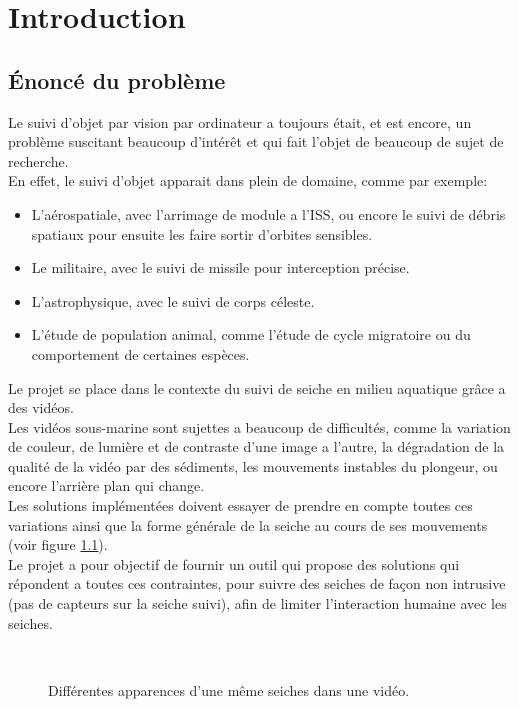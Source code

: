 \chapter{Introduction}





\section{Énoncé du problème}
Le suivi d'objet par vision par ordinateur a toujours était, et est encore, un problème suscitant beaucoup d'intérêt et qui fait l'objet de beaucoup de sujet de recherche.\\
En effet, le suivi d'objet apparait dans plein de domaine, comme par exemple:
\begin{itemize}
	\item L'aérospatiale, avec l'arrimage de module a l'ISS, ou encore le suivi de débris spatiaux pour ensuite les faire sortir d'orbites sensibles.
	\item Le militaire, avec le suivi de missile pour interception précise.
	\item L'astrophysique, avec le suivi de corps céleste.
	\item L'étude de population animal, comme l'étude de cycle migratoire ou du comportement de certaines espèces.\\
\end{itemize}

Le projet se place dans le contexte du suivi de seiche en milieu aquatique grâce a des vidéos.\\
Les vidéos sous-marine sont sujettes a beaucoup de difficultés, comme la variation de couleur, de lumière et de contraste d'une image a l'autre, la dégradation de la qualité de la vidéo par des sédiments, les mouvements instables du plongeur, ou encore l'arrière plan qui change.\\
Les solutions implémentées doivent essayer de prendre en compte toutes ces variations ainsi que la forme générale de la seiche au cours de ses mouvements (voir figure \ref{fig:cuttlefish_variation}).\\
Le projet a pour objectif de fournir un outil qui propose des solutions qui répondent a toutes ces contraintes, pour suivre des seiches de façon non intrusive (pas de capteurs sur la seiche suivi), afin de limiter l'interaction humaine avec les seiches.

\begin{figure}
\center
	\hspace{0.5cm}
	\\
	\hspace{0.5cm}
\caption{Différentes apparences d'une même seiches dans une vidéo.}
\label{fig:cuttlefish_variation}
\end{figure}
\FloatBarrier





